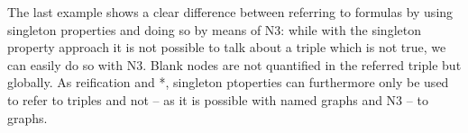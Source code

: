 The last example shows a clear difference between referring to formulas by using singleton properties and doing so by means of N3: while with the singleton property approach 
it is not possible to talk about a triple which is not true, we can easily do so with N3. Blank nodes are not quantified in the referred triple but globally. 
As reification and \rdf{}*, singleton ptoperties can furthermore only be used to 
refer to triples and not -- as it is possible with named graphs and N3 -- to  graphs.

% 




